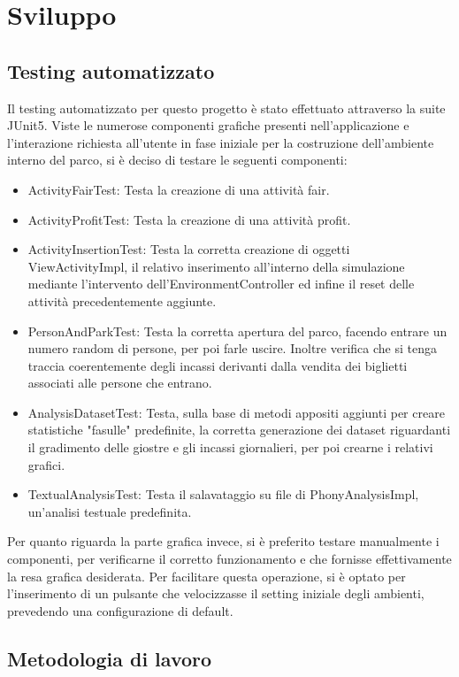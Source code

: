 \documentclass[a4paper,12pt]{report}
\begin{document}
\chapter{Sviluppo}
\section{Testing automatizzato}

Il testing automatizzato  per questo progetto è stato effettuato attraverso la suite JUnit5. Viste le numerose componenti grafiche presenti nell'applicazione e l'interazione richiesta all'utente in fase iniziale per la costruzione dell'ambiente interno del parco, si è deciso di testare le seguenti componenti:


\begin{itemize}
 \item ActivityFairTest: Testa la creazione di una attività fair.
 \item ActivityProfitTest: Testa la creazione di una attività profit.
 \item ActivityInsertionTest: Testa la corretta creazione di oggetti ViewActivityImpl, il relativo inserimento all'interno della simulazione mediante l'intervento dell'EnvironmentController ed infine il reset delle attività precedentemente aggiunte.
 \item PersonAndParkTest: Testa la corretta apertura del parco, facendo entrare un numero random di persone, per poi farle uscire. Inoltre verifica che si tenga traccia coerentemente degli incassi derivanti dalla vendita dei biglietti associati alle persone che entrano.
 \item AnalysisDatasetTest: Testa, sulla base di metodi appositi aggiunti per creare statistiche "fasulle" predefinite, la corretta generazione dei dataset riguardanti il gradimento delle giostre e gli incassi giornalieri, per poi crearne i relativi grafici.
 \item TextualAnalysisTest: Testa il salavataggio su file di PhonyAnalysisImpl, un'analisi testuale predefinita.
\end{itemize}

Per quanto riguarda la parte grafica invece, si è preferito testare manualmente i componenti, per verificarne il corretto funzionamento e che fornisse effettivamente la resa grafica desiderata. Per facilitare questa operazione, si è optato per l'inserimento di un pulsante che velocizzasse il setting iniziale degli ambienti, prevedendo una configurazione di default.

\section{Metodologia di lavoro}
\end{document}
